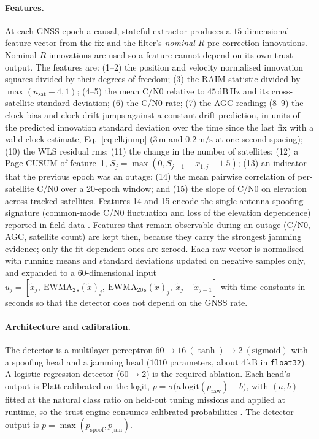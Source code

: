 \documentclass[journal]{IEEEtran}
\begin{document}
\paragraph{Features.}
At each GNSS epoch a causal, stateful extractor produces a $15$-dimensional feature vector from the fix
and the filter's \emph{nominal-$R$} pre-correction innovations. Nominal-$R$ innovations are used so a
feature cannot depend on its own trust output. The features are: (1--2) the position and velocity
normalised innovation squares divided by their degrees of freedom; (3) the RAIM statistic divided by
$\max(n_{\mathrm{sat}}-4, 1)$; (4--5) the mean C/N0 relative to $45\,\mathrm{dB\,Hz}$ and its
cross-satellite standard deviation; (6) the C/N0 rate; (7) the AGC reading; (8--9) the clock-bias and
clock-drift jumps against a constant-drift prediction, in units of the predicted innovation standard deviation
over the time since the last fix with a valid clock estimate, Eq.~\eqref{eq:clkjump} ($3\,\mathrm{m}$ and $0.2\,\mathrm{m/s}$ at
one-second spacing);
(10) the WLS residual rms; (11) the change in the number of satellites; (12) a Page CUSUM of feature~1,
$S_j = \max(0, S_{j-1} + x_{1,j} - 1.5)$; (13) an indicator that the previous epoch was an outage;
(14) the mean pairwise correlation of per-satellite C/N0 over a 20-epoch window; and (15) the slope of C/N0 on
elevation across tracked satellites. Features 14 and 15 encode the single-antenna spoofing signature
(common-mode C/N0 fluctuation and loss of the elevation dependence) reported in field data
\cite{rados2024recent}. Features that remain observable during an outage (C/N0, AGC, satellite count) are
kept then, because they carry the strongest jamming evidence; only the fit-dependent ones are zeroed.
Each raw vector is normalised with running means and standard deviations updated on negative samples only,
and expanded to a $60$-dimensional input
$u_j = [\tilde x_j,\ \mathrm{EWMA}_{2\,\mathrm{s}}(\tilde x)_j,\ \mathrm{EWMA}_{20\,\mathrm{s}}(\tilde x)_j,\ \tilde x_j - \tilde x_{j-1}]$
with time constants in seconds so that the detector does not depend on the GNSS rate.

\paragraph{Architecture and calibration.}
The detector is a multilayer perceptron $60 \rightarrow 16\ (\tanh) \rightarrow 2\ (\mathrm{sigmoid})$ with a
spoofing head and a jamming head ($1010$ parameters, about $4\,\mathrm{kB}$ in \texttt{float32}). A
logistic-regression detector ($60\rightarrow 2$) is the required ablation. Each head's output is Platt
calibrated on the logit, $p = \sigma\!\big(a\,\mathrm{logit}(p_{\mathrm{raw}}) + b\big)$, with $(a,b)$ fitted at
the natural class ratio on held-out tuning missions and applied at runtime, so the trust engine consumes
calibrated probabilities \cite{guo2017calibration}. The detector output is $p = \max(p_{\mathrm{spoof}}, p_{\mathrm{jam}})$.
\end{document}
